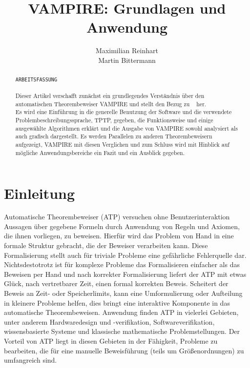 \documentclass{article}
\author{
	Maximilian Reinhart\\
	Martin Bittermann
}
\title{VAMPIRE: Grundlagen und Anwendung}
\begin{document}
\maketitle

\begin{abstract}
	\texttt{ARBEITSFASSUNG}\\
	\\
	Dieser Artikel verschafft zunächst ein grundlegendes Verständnis über den automatischen Theorembeweiser VAMPIRE und
	stellt den Bezug zu ~\cite{cav2013} her. \\
	Es wird eine Einführung in die generelle Benutzung der Software und die verwendete Problembeschreibungssprache, TPTP, gegeben, 
	die Funktionsweise und einige ausgewählte Algorithmen erklärt und
	die Ausgabe von VAMPIRE sowohl analysiert als auch grafisch dargestellt.
	Es werden Parallelen zu anderen Theorembeweisern aufgezeigt, VAMPIRE mit diesen Verglichen 
	und zum Schluss wird mit Hinblick auf mögliche Anwendungsbereiche ein Fazit und ein Ausblick gegeben.
\end{abstract}


\section{Einleitung}
\label{sec:introduction}

Automatische Theorembeweiser (ATP) versuchen ohne Benutzerinteraktion Aussagen über gegebene Formeln durch Anwendung von Regeln und Axiomen, die ihnen vorliegen, zu beweisen.
Hierfür wird das Problem von Hand in eine formale Struktur gebracht, die der Beweiser verarbeiten kann.
Diese Formalisierung stellt auch für triviale Probleme eine gefährliche Fehlerquelle dar. 
Nichtsdestotrotz ist für komplexe Probleme das Formalisieren einfacher als das Beweisen per Hand und nach korrekter Formalisierung liefert der ATP mit etwas Glück, nach vertretbarer Zeit,
einen formal korrekten Beweis. Scheitert der Beweis an Zeit- oder Speicherlimits, kann eine
Umformulierung oder Aufteilung in kleinere Probleme helfen, dies bringt eine interaktive
Komponente in das automatische Theorembeweisen.
Anwendung finden ATP in vielerlei Gebieten, unter anderem Hardwaredesign und -verifikation, Softwareverifikation, wissensbasierte Systeme und klassische mathematische Problemstellungen.
Der Vorteil von ATP liegt in diesen Gebieten in der Fähigkeit, Probleme zu bearbeiten, 
die für eine manuelle Beweisführung (teils um Größenordnungen) zu umfangreich sind.
\end{document}
